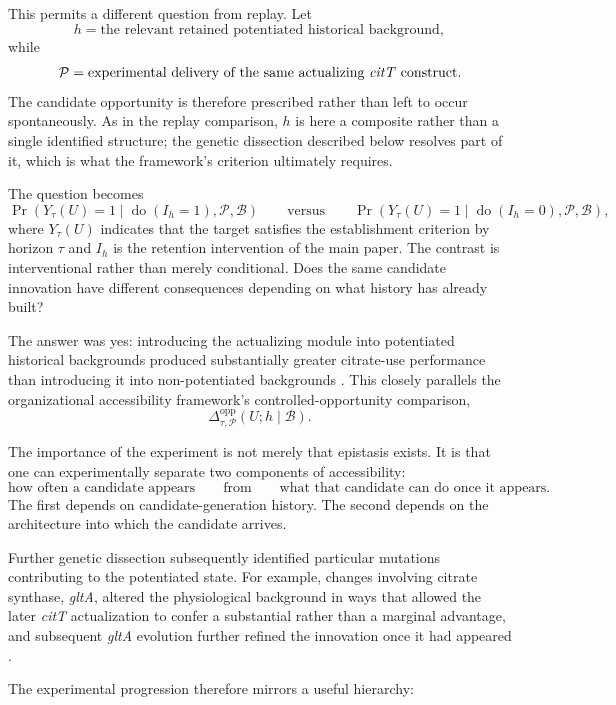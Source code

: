 \documentclass[11pt]{article}
\begin{document}
This permits a different question from replay. Let
\[
h=\text{the relevant retained potentiated historical background},
\]
while
\[
\mathcal P=\text{experimental delivery of the same actualizing \emph{citT} construct}.
\]
The candidate opportunity is therefore prescribed rather than left to occur spontaneously. As in the replay comparison, $h$ is here a composite rather than a single identified structure; the genetic dissection described below resolves part of it, which is what the framework's criterion ultimately requires.

The question becomes
\[
\Pr\!\left(Y_\tau(U)=1\mid\operatorname{do}(I_h=1),\mathcal P,\mathcal B\right)
\qquad\text{versus}\qquad
\Pr\!\left(Y_\tau(U)=1\mid\operatorname{do}(I_h=0),\mathcal P,\mathcal B\right),
\]
where $Y_\tau(U)$ indicates that the target satisfies the establishment criterion by horizon $\tau$ and $I_h$ is the retention intervention of the main paper. The contrast is interventional rather than merely conditional. Does the same candidate innovation have different consequences depending on what history has already built?

The answer was yes: introducing the actualizing module into potentiated historical backgrounds produced substantially greater citrate-use performance than introducing it into non-potentiated backgrounds \cite{Blount2012}. This closely parallels the organizational accessibility framework's controlled-opportunity comparison,
\[
\Delta_{\tau,\mathcal P}^{\mathrm{opp}}(U;h\mid\mathcal B).
\]

The importance of the experiment is not merely that epistasis exists. It is that one can experimentally separate two components of accessibility:
\[
\text{how often a candidate appears}
\qquad\text{from}\qquad
\text{what that candidate can do once it appears}.
\]
The first depends on candidate-generation history. The second depends on the architecture into which the candidate arrives.

Further genetic dissection subsequently identified particular mutations contributing to the potentiated state. For example, changes involving citrate synthase, \emph{gltA}, altered the physiological background in ways that allowed the later \emph{citT} actualization to confer a substantial rather than a marginal advantage, and subsequent \emph{gltA} evolution further refined the innovation once it had appeared \cite{Quandt2015}.

The experimental progression therefore mirrors a useful hierarchy:
\begin{center}
\end{center}
\end{document}
